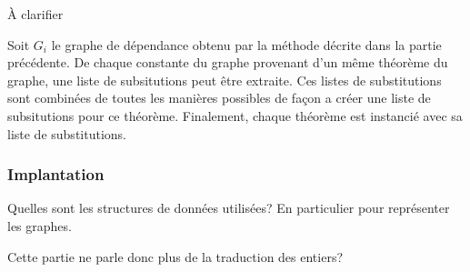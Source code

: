 \todo À clarifier

Soit $G_i$ le graphe de dépendance obtenu par la méthode décrite dans la
partie précédente. De chaque constante du graphe provenant d'un même
théorème du graphe, une liste de subsitutions peut être extraite. Ces
listes de substitutions sont combinées de toutes les manières possibles
de façon a créer une liste de subsitutions pour ce théorème. Finalement,
chaque théorème est instancié avec sa liste de substitutions.


\subsubsection{Implantation}

\todo Quelles sont les structures de données utilisées? En particulier
pour représenter les graphes.


\todo Cette partie ne parle donc plus de la traduction des entiers?



